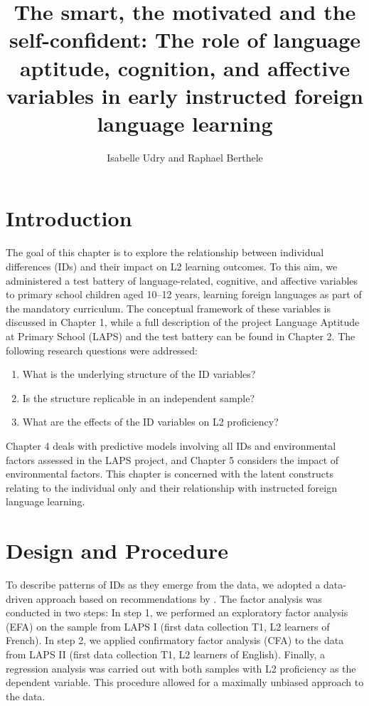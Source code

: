 \documentclass[output=paper]{langsci/langscibook}
\author{Isabelle Udry\orcid{}\affiliation{University of Fribourg, Institut de Plurilinguisme; Zurich University of Teacher Education} and Raphael Berthele\orcid{}\affiliation{University of Fribourg, Institut de Plurilinguisme}}
\title[The smart, the motivated and the self-confident]
      {The smart, the motivated and the self-confident: The role of language aptitude, cognition, and affective variables in early instructed foreign language learning}
\begin{document}
\renewcommand{\lsChapterFooterSize}{\footnotesize}
\maketitle 

\section{Introduction}

The goal of this chapter is to explore the relationship between individual differences (IDs) and their impact on L2 learning outcomes. To this aim, we administered a test battery of language-related, cognitive, and affective variables to primary school children aged 10--12 years, learning foreign languages as part of the mandatory curriculum. The conceptual framework of these variables is discussed in Chapter 1, while a full description of the project Language Aptitude at Primary School (LAPS) and the test battery can be found in Chapter 2. The following research questions were addressed:

\begin{enumerate}
\item  What is the underlying structure of the ID variables?
\item  Is the structure replicable in an independent sample?
\item  What are the effects of the ID variables on L2 proficiency?
\end{enumerate}

Chapter 4 deals with predictive models involving all IDs and environmental factors assessed in the LAPS project, and Chapter 5 considers the impact of environmental factors. This chapter is concerned with the latent constructs relating to the individual only and their relationship with instructed foreign language learning. 

\section{Design and Procedure}\largerpage %

To describe patterns of IDs as they emerge from the data, we adopted a data-driven approach based on recommendations by \citet{Brown2006}. The factor analysis was conducted in two steps: In step 1, we performed an exploratory factor analysis (EFA) on the sample from LAPS I (first data collection T1, L2 learners of French). In step 2, we applied confirmatory factor analysis (CFA) to the data from LAPS II (first data collection T1, L2 learners of English). Finally, a regression analysis was carried out with both samples with L2 proficiency as the dependent variable. This procedure allowed for a maximally unbiased approach to the data. 
\end{document}
